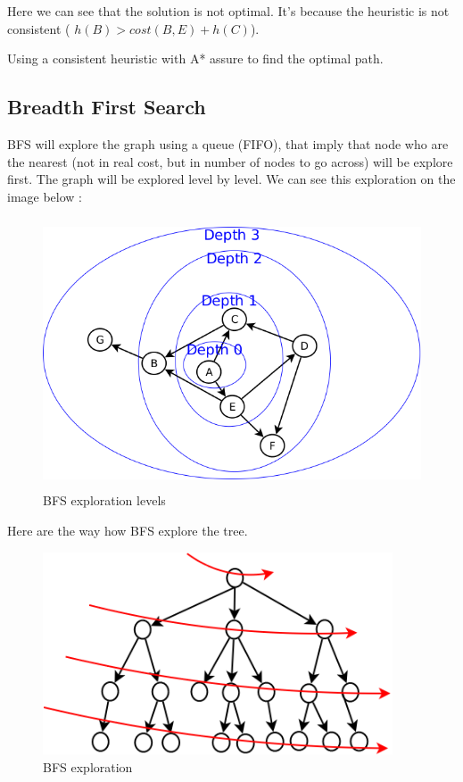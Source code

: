 Here we can see that the solution is not optimal. It's because the heuristic is not consistent ( $h(B) > cost(B,E) + h(C)$).

Using a consistent heuristic with A* assure to find the optimal path.

  \subsection{Breadth First Search}
BFS will explore the graph using a queue (FIFO), that imply that node who are the nearest (not in real cost, but in number of nodes to go across) will be explore first. The graph will be explored level by level.
We can see this exploration on the image below :

\begin{figure}[!h]
  \centering
  \includegraphics[height=8cm]{img/BFS_Levels.png}
  \caption{BFS exploration levels}
  \label{BFS_Levels}
\end{figure} 

Here are the way how BFS explore the tree.

\begin{figure}[h!]
  \centering
  \includegraphics[height=6cm]{img/BFS_explo.png}
  \caption{BFS exploration}
\end{figure} 

